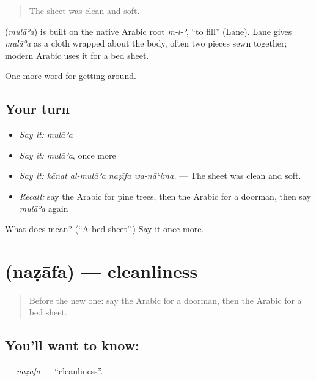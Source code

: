 \begin{quote}
The sheet was clean and soft.
\end{quote}

\begin{cousinweb}
\textbf{} (\emph{mulāʾa}) is built on the native Arabic root \emph{m-l-ʾ}, \textquotedblleft{}to fill\textquotedblright{} (Lane). Lane gives \emph{mulāʾa} as a cloth wrapped about the body, often two pieces sewn together; modern Arabic uses it for a bed sheet.
\end{cousinweb}

\begin{grammarlens}[title={What you've built}]
One more word for getting around.
\end{grammarlens}

\subsection*{Your turn}
\begin{itemize}
\raggedright
  \item \emph{Say it:} \emph{mulāʾa}
  \item \emph{Say it:} \emph{mulāʾa}, once more
  \item \emph{Say it:} \emph{kānat al-mulāʾa naẓīfa wa-nāʿima.} — The sheet was clean and soft.
  \item \emph{Recall:} say the Arabic for pine trees, then the Arabic for a doorman, then say \emph{mulāʾa} again
\end{itemize}

\begin{tcolorbox}[breakable,colback=teal!4,colframe=teal!35!black,title={Before you move on}]
What does  mean? (\textquotedblleft{}A bed sheet\textquotedblright{}.) Say it once more.
\end{tcolorbox}
\section[\texorpdfstring{\ar{نظافة} (naẓāfa)}{نظافة (naẓāfa)}]{ (naẓāfa) — cleanliness}

\label{lesson:AR-C443-nazafa}



\begin{quote}
Before the new one: say the Arabic for a doorman, then the Arabic for a bed sheet.
\end{quote}

\subsection*{You'll want to know: }
\textbf{} — \emph{naẓāfa} — \textquotedblleft{}cleanliness\textquotedblright{}.

